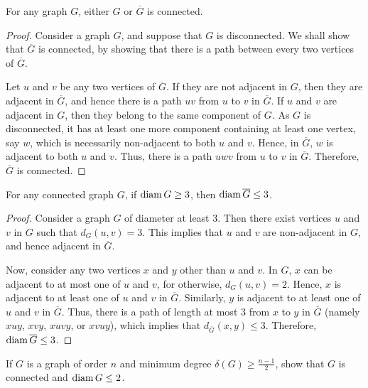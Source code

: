 \begin{Theorem}\label{thm:GorGCompConn}
For any graph $G$, either $G$ or $\overline G$ is connected.
\end{Theorem}

\begin{proof}
Consider a graph $G$, and suppose that $G$ is disconnected. We shall show that $\overline G$ is connected, by showing that there is a path between every two vertices of $\overline G$.

Let $u$ and $v$ be any two vertices of $\overline G$. If they are not adjacent in $G$, then they are adjacent in $\overline G$, and hence there is a path $uv$ from $u$ to $v$ in $\overline G$. If $u$ and $v$ are adjacent in $G$, then they belong to the same component of $G$. As $G$ is disconnected, it has at least one more component containing at least one vertex, say $w$, which is necessarily non-adjacent to both $u$ and $v$. Hence, in $\overline G$, $w$ is adjacent to both $u$ and $v$. Thus, there is a path $uwv$ from $u$ to $v$ in $\overline G$. Therefore, $\overline G$ is connected.
\end{proof}

\begin{Theorem}\label{thm:Diam>=3}
For any connected graph $G$, if $\operatorname{diam} G \ge 3$, then $\operatorname{diam} \overline G \le 3$.
\end{Theorem}

\begin{proof}
Consider a graph $G$ of diameter at least $3$. Then there exist vertices $u$ and $v$ in $G$ such that $d_G(u, v) = 3$. This implies that $u$ and $v$ are non-adjacent in $G$, and hence adjacent in $\overline G$.

Now, consider any two vertices $x$ and $y$ other than $u$ and $v$. In $G$, $x$ can be adjacent to at most one of $u$ and $v$, for otherwise, $d_G(u,v) = 2$. Hence, $x$ is adjacent to at least one of $u$ and $v$ in $\overline G$. Similarly, $y$ is adjacent to at least one of $u$ and $v$ in $\overline G$. Thus, there is a path of length at most $3$ from $x$ to $y$ in $\overline G$ (namely $xuy$, $xvy$, $xuvy$, or $xvuy$), which implies that $d_{\overline G}(x, y) \le 3$. Therefore, $\operatorname{diam} \overline G \le 3$.
\end{proof}

\begin{Exercise}
If $G$ is a graph of order $n$ and minimum degree $\delta(G) \ge \frac{n-1}{2}$, show that $G$ is connected and $\operatorname{diam} G \le 2$.
\end{Exercise}


